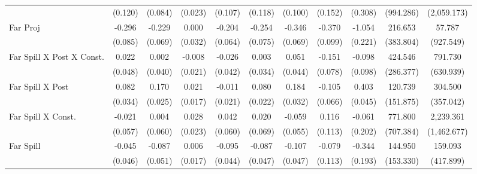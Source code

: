 {\begin{tabular}{l*{10}{c}}
                &  (0.120)         &  (0.084)         &  (0.023)         &  (0.107)         &  (0.118)         &  (0.100)         &  (0.152)         &  (0.308)         &(994.286)         &(2,059.173)         \\
[1em]
Far Proj        &   -0.296\sym{***}&   -0.229\sym{***}&    0.000         &   -0.204\sym{***}&   -0.254\sym{***}&   -0.346\sym{***}&   -0.370\sym{***}&   -1.054\sym{***}&  216.653         &   57.787         \\
                &  (0.085)         &  (0.069)         &  (0.032)         &  (0.064)         &  (0.075)         &  (0.069)         &  (0.099)         &  (0.221)         &(383.804)         &(927.549)         \\
[1em]
Far Spill X Post X Const.&    0.022         &    0.002         &   -0.008         &   -0.026         &    0.003         &    0.051         &   -0.151\sym{*}  &   -0.098         &  424.546         &  791.730         \\
                &  (0.048)         &  (0.040)         &  (0.021)         &  (0.042)         &  (0.034)         &  (0.044)         &  (0.078)         &  (0.098)         &(286.377)         &(630.939)         \\
[1em]
Far Spill X Post&    0.082\sym{**} &    0.170\sym{***}&    0.021         &   -0.011         &    0.080\sym{***}&    0.184\sym{***}&   -0.105         &    0.403\sym{***}&  120.739         &  304.500         \\
                &  (0.034)         &  (0.025)         &  (0.017)         &  (0.021)         &  (0.022)         &  (0.032)         &  (0.066)         &  (0.045)         &(151.875)         &(357.042)         \\
[1em]
Far Spill X Const.&   -0.021         &    0.004         &    0.028         &    0.042         &    0.020         &   -0.059         &    0.116         &   -0.061         &  771.800         &2,239.361         \\
                &  (0.057)         &  (0.060)         &  (0.023)         &  (0.060)         &  (0.069)         &  (0.055)         &  (0.113)         &  (0.202)         &(707.384)         &(1,462.677)         \\
[1em]
Far Spill       &   -0.045         &   -0.087\sym{*}  &    0.006         &   -0.095\sym{**} &   -0.087\sym{*}  &   -0.107\sym{**} &   -0.079         &   -0.344\sym{*}  &  144.950         &  159.093         \\
                &  (0.046)         &  (0.051)         &  (0.017)         &  (0.044)         &  (0.047)         &  (0.047)         &  (0.113)         &  (0.193)         &(153.330)         &(417.899)         \\

\end{tabular}}
